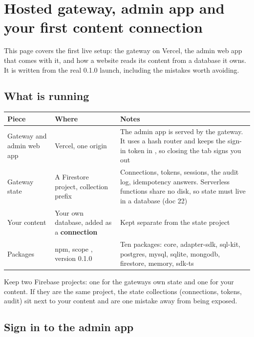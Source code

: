 \documentclass[11pt,a4paper]{article}
\newcommand{\code}[1]{\IfSubStr{\detokenize{#1}}{ }{\texttt{\detokenize{#1}}}{\texttt{\expandafter\seqsplit\expandafter{\detokenize{#1}}}}}
\begin{document}
\section{Hosted gateway, admin app and your first content connection}

This page covers the first live setup: the gateway on Vercel, the admin
web app that comes with it, and how a website reads its content from a
database it owns. It is written from the real 0.1.0 launch, including
the mistakes worth avoiding.

\subsection{What is running}

\begingroup\footnotesize\begin{longtable}[]{@{}>{\raggedright\arraybackslash}p{}>{\raggedright\arraybackslash}p{}>{\raggedright\arraybackslash}p{}@{}}
\toprule\noalign{}
Piece & Where & Notes \\
\midrule\noalign{}
\endhead
\bottomrule\noalign{}
\endlastfoot
Gateway and admin web app & Vercel, one origin & The admin app is served
by the gateway. It uses a hash router and keeps the sign-in token in
\code{sessionStorage}, so closing the tab signs you out \\
Gateway state & A Firestore project, collection prefix \code{sethucms} &
Connections, tokens, sessions, the audit log, idempotency answers.
Serverless functions share no disk, so state must live in a database
(doc 22) \\
Your content & Your own database, added as a \textbf{connection} & Kept
separate from the state project \\
Packages & npm, scope \code{@sethucms}, version 0.1.0 & Ten packages:
core, adapter-sdk, sql-kit, postgres, mysql, sqlite, mongodb, firestore,
memory, sdk-ts \\
\end{longtable}\endgroup

Keep two Firebase projects: one for the gateway\textquotesingle s own
state and one for your content. If they are the same project, the state
collections (connections, tokens, audit) sit next to your content and
are one mistake away from being exposed.

\subsection{Sign in to the admin app}
\end{document}
